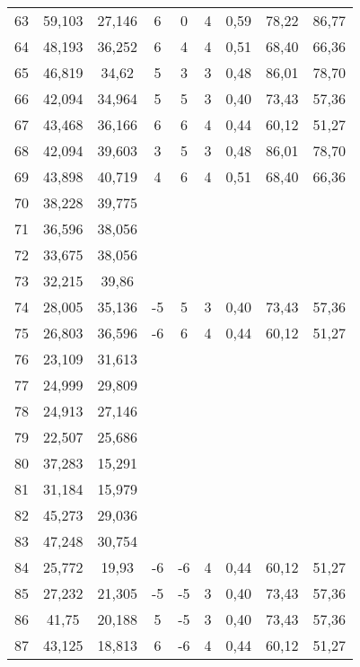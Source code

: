 \begin{table}[h]
\begin{tabular}{ccccccccc}
63 & 59,103 & 27,146 & 6 & 0 & 4 & 0,59 & 78,22 & 86,77\\
64 & 48,193 & 36,252 & 6 & 4 & 4 & 0,51 & 68,40 & 66,36\\
65 & 46,819 & 34,62 & 5 & 3 & 3 & 0,48 & 86,01 & 78,70\\
66 & 42,094 & 34,964 & 5 & 5 & 3 & 0,40 & 73,43 & 57,36\\
67 & 43,468 & 36,166 & 6 & 6 & 4 & 0,44 & 60,12 & 51,27\\
68 & 42,094 & 39,603 & 3 & 5 & 3 & 0,48 & 86,01 & 78,70\\
69 & 43,898 & 40,719 & 4 & 6 & 4 & 0,51 & 68,40 & 66,36\\
70 & 38,228 & 39,775 &  &  &  &  &  & \\
71 & 36,596 & 38,056 &  &  &  &  &  & \\
72 & 33,675 & 38,056 &  &  &  &  &  & \\
73 & 32,215 & 39,86 &  &  &  &  &  & \\
74 & 28,005 & 35,136 & -5 & 5 & 3 & 0,40 & 73,43 & 57,36\\
75 & 26,803 & 36,596 & -6 & 6 & 4 & 0,44 & 60,12 & 51,27\\
76 & 23,109 & 31,613 &  &  &  &  &  & \\
77 & 24,999 & 29,809 &  &  &  &  &  & \\
78 & 24,913 & 27,146 &  &  &  &  &  & \\
79 & 22,507 & 25,686 &  &  &  &  &  & \\
80 & 37,283 & 15,291 &  &  &  &  &  & \\
81 & 31,184 & 15,979 &  &  &  &  &  & \\
82 & 45,273 & 29,036 &  &  &  &  &  & \\
83 & 47,248 & 30,754 &  &  &  &  &  & \\
84 & 25,772 & 19,93 & -6 & -6 & 4 & 0,44 & 60,12 & 51,27\\
85 & 27,232 & 21,305 & -5 & -5 & 3 & 0,40 & 73,43 & 57,36\\
86 & 41,75 & 20,188 & 5 & -5 & 3 & 0,40 & 73,43 & 57,36\\
87 & 43,125 & 18,813 & 6 & -6 & 4 & 0,44 & 60,12 & 51,27\\
\bottomrule
\end{tabular}
\end{table}

